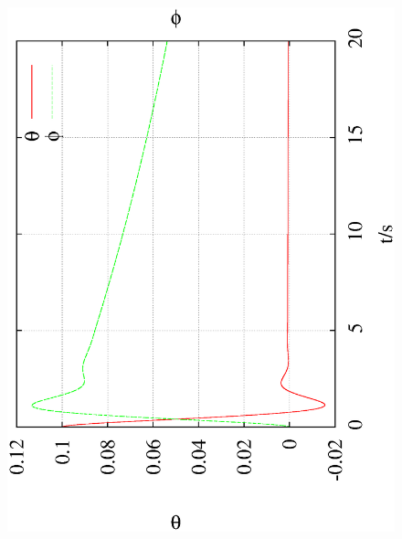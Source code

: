 \documentclass[10pt,a4paper]{article}
\begin{document}
\begin{figure}[h!]
\begin{center}
\includegraphics[scale = 0.2, angle =-90]{0.001_1_0.01_theta_phi.eps}

\end{center}
\end{figure}
\end{document}
